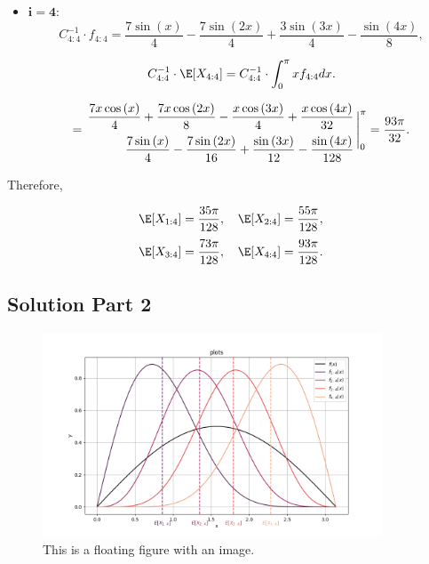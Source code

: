 \begin{itemize}
    \item $\boldsymbol{i = 4:}$
    \[ C_{4:4}^{-1} \cdot f_{4:4} = \frac{7 \sin{\left(x \right)}}{4} - \frac{7 \sin{\left(2 x \right)}}{4} + \frac{3 \sin{\left(3 x \right)}}{4} - \frac{\sin{\left(4 x \right)}}{8},\]

    \[ C_{4:4}^{-1} \cdot \E[X_{4:4}] = C_{4:4}^{-1} \cdot \int_0^\pi x f_{4:4} dx.\]
    \[ = \everymath{\displaystyle}
    \arraycolsep=1.8pt\def\arraystretch{2.2}
    \begin{array}{r}
        \- \frac{7 x \cos{\left(x \right)}}{4} + \frac{7 x \cos{\left(2 x \right)}}{8} - \frac{x \cos{\left(3 x \right)}}{4} + \frac{x \cos{\left(4 x \right)}}{32}\\
        \frac{7 \sin{\left(x \right)}}{4} - \frac{7 \sin{\left(2 x \right)}}{16} + \frac{\sin{\left(3 x \right)}}{12} - \frac{\sin{\left(4 x \right)}}{128}
    \end{array} \Bigg|_0^\pi = \frac{93 \pi}{32}. \]
\end{itemize}

Therefore,

\[ \E [X_{1:4}] = \frac{35 \pi}{128},\hspace*{1em} \E [X_{2:4}] = \frac{55 \pi}{128},\]
\[ \E [X_{3:4}] = \frac{73 \pi}{128},\hspace*{1em} \E [X_{4:4}] = \frac{93 \pi}{128}.\]

\subsection*{Solution Part 2}

\begin{figure}[h] %
    \centering
    \includegraphics[width=0.9\textwidth]{../simulation/1b.png} %
    \caption{This is a floating figure with an image.}
    \label{fig:example}
\end{figure}

